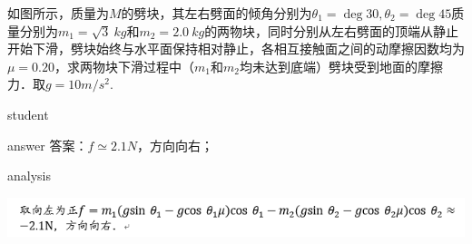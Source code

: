 \begin{example}
	如图所示，质量为$ M $的劈块，其左右劈面的倾角分别为$\theta_1 = \deg{30},\theta_2 = \deg{45} $质量分别为$ m_1=\sqrt{3}~\si{kg}  $和$ m_2=2.0~\si{kg}  $的两物块，同时分别从左右劈面的顶端从静止开始下滑，劈块始终与水平面保持相对静止，各相互接触面之间的动摩擦因数均为$ \mu=0.20 $，求两物块下滑过程中（$ m_1 $和$ m_2 $均未达到底端）劈块受到地面的摩擦力．取$ g = 10\si{m/s^2} $.
	
	\begin{taggedblock}{student}
		\vspace*{2cm}
	\end{taggedblock}
	
	
	\begin{taggedblock}{answer}
		答案：$ f\simeq 2.1\si{N} $，方向向右；
	\end{taggedblock}
	
	
	\begin{taggedblock}{analysis}
		\begin{center}
\includegraphics[width=0.9\linewidth]{image/newton-5}
\end{center}

	\end{taggedblock}
\end{example}


